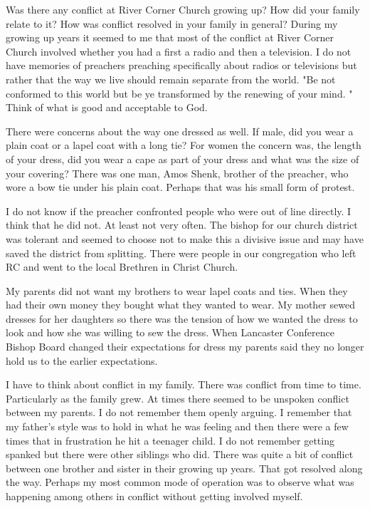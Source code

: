 Was there any conflict at River Corner Church growing up? How did your family relate to it? How was conflict resolved in your family in general?
During my growing up years it seemed to me that most of the conflict at River Corner Church involved whether you had a first a radio and then a television.
I do not have memories of preachers preaching specifically about radios or televisions but rather that the way we live should remain separate from the world.
"Be not conformed to this world but be ye transformed by the renewing of your mind.
" Think of what is good and acceptable to God.

There were concerns about the way one dressed as well.
If male, did you wear a plain coat or a lapel coat with a long tie? For women the concern was, the length of your dress, did you wear a cape as part of your dress and what was the size of your covering?
There was one man, Amos Shenk, brother of the preacher, who wore a bow tie under his plain coat.
Perhaps that was his small form of protest.

I do not know if the preacher confronted people who were out of line directly.
I think that he did not.
At least not very often.
The bishop for our church district was tolerant and seemed to choose not to make this a divisive issue and may have saved the district from splitting.
There were people in our congregation who left RC and went to the local Brethren in Christ Church.

My parents did not want my brothers to wear lapel coats and ties.
When they had their own money they bought what they wanted to wear.
My mother sewed dresses for her daughters so there was the tension of how we wanted the dress to look and how she was willing to sew the dress.
When Lancaster Conference Bishop Board changed their expectations for dress my parents said they no longer hold us to the earlier expectations.

I have to think about conflict in my family.
There was conflict from time to time.
Particularly as the family grew.
At times there seemed to be unspoken conflict between my parents.
I do not remember them openly arguing.
I remember that my father's style was to hold in what he was feeling and then there were a few times that in frustration he hit a teenager child.
I do not remember getting spanked but there were other siblings who did.
There was quite a bit of conflict between one brother and sister in their growing up years.
That got resolved along the way.
Perhaps my most common mode of operation was to observe what was happening among others in conflict without getting involved myself.





